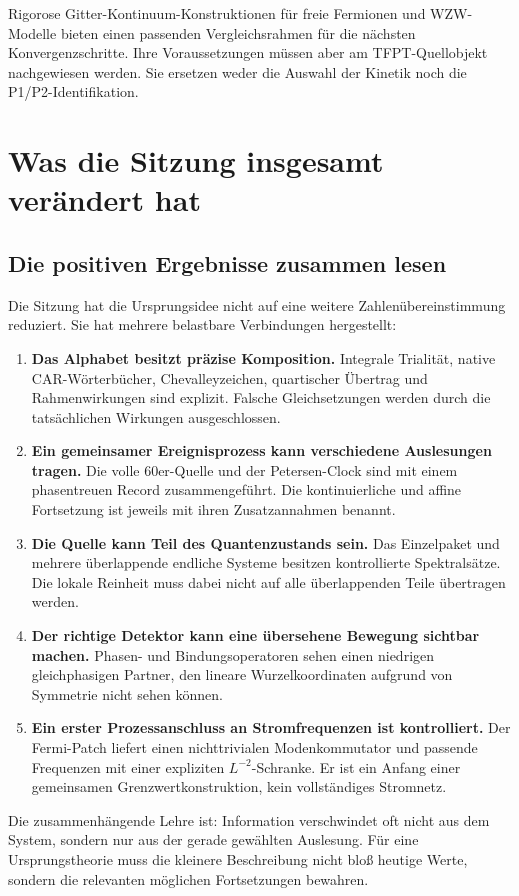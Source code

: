 Rigorose Gitter-Kontinuum-Konstruktionen für freie Fermionen und WZW-Modelle bieten einen passenden Vergleichsrahmen für die nächsten Konvergenzschritte. Ihre Voraussetzungen müssen aber am TFPT-Quellobjekt nachgewiesen werden. Sie ersetzen weder die Auswahl der Kinetik noch die P1/P2-Identifikation. \cite{osborne}

\chapter{Was die Sitzung insgesamt verändert hat}
\section{Die positiven Ergebnisse zusammen lesen}
Die Sitzung hat die Ursprungsidee nicht auf eine weitere Zahlenübereinstimmung reduziert. Sie hat mehrere belastbare Verbindungen hergestellt:
\begin{enumerate}
\item \textbf{Das Alphabet besitzt präzise Komposition.} Integrale Trialität, native CAR-Wörterbücher, Chevalleyzeichen, quartischer Übertrag und Rahmenwirkungen sind explizit. Falsche Gleichsetzungen werden durch die tatsächlichen Wirkungen ausgeschlossen.
\item \textbf{Ein gemeinsamer Ereignisprozess kann verschiedene Auslesungen tragen.} Die volle 60er-Quelle und der Petersen-Clock sind mit einem phasentreuen Record zusammengeführt. Die kontinuierliche und affine Fortsetzung ist jeweils mit ihren Zusatzannahmen benannt.
\item \textbf{Die Quelle kann Teil des Quantenzustands sein.} Das Einzelpaket und mehrere überlappende endliche Systeme besitzen kontrollierte Spektralsätze. Die lokale Reinheit muss dabei nicht auf alle überlappenden Teile übertragen werden.
\item \textbf{Der richtige Detektor kann eine übersehene Bewegung sichtbar machen.} Phasen- und Bindungsoperatoren sehen einen niedrigen gleichphasigen Partner, den lineare Wurzelkoordinaten aufgrund von Symmetrie nicht sehen können.
\item \textbf{Ein erster Prozessanschluss an Stromfrequenzen ist kontrolliert.} Der Fermi-Patch liefert einen nichttrivialen Modenkommutator und passende Frequenzen mit einer expliziten $L^{-2}$-Schranke. Er ist ein Anfang einer gemeinsamen Grenzwertkonstruktion, kein vollständiges Stromnetz.
\end{enumerate}

Die zusammenhängende Lehre ist: Information verschwindet oft nicht aus dem System, sondern nur aus der gerade gewählten Auslesung. Für eine Ursprungstheorie muss die kleinere Beschreibung nicht bloß heutige Werte, sondern die relevanten möglichen Fortsetzungen bewahren.

